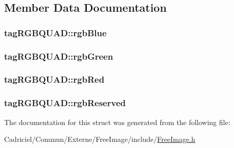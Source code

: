 \subsection{Member Data Documentation}
\hypertarget{structtag_r_g_b_q_u_a_d_ad99c50770a73c6fae3ee1ea627da1c60}{
\subsubsection[{rgb\-Blue}]{ tag\-R\-G\-B\-Q\-U\-A\-D\-::rgb\-Blue}}\label{structtag_r_g_b_q_u_a_d_ad99c50770a73c6fae3ee1ea627da1c60}
\hypertarget{structtag_r_g_b_q_u_a_d_a4dae0a7db2f4d432cb4da3de4ef337bd}{
\subsubsection[{rgb\-Green}]{ tag\-R\-G\-B\-Q\-U\-A\-D\-::rgb\-Green}}\label{structtag_r_g_b_q_u_a_d_a4dae0a7db2f4d432cb4da3de4ef337bd}
\hypertarget{structtag_r_g_b_q_u_a_d_aa143fcd3ff08a04b152bee9d410821a6}{
\subsubsection[{rgb\-Red}]{ tag\-R\-G\-B\-Q\-U\-A\-D\-::rgb\-Red}}\label{structtag_r_g_b_q_u_a_d_aa143fcd3ff08a04b152bee9d410821a6}
\hypertarget{structtag_r_g_b_q_u_a_d_a2758aec56e37d4f3f5fde511a58f4f82}{
\subsubsection[{rgb\-Reserved}]{ tag\-R\-G\-B\-Q\-U\-A\-D\-::rgb\-Reserved}}\label{structtag_r_g_b_q_u_a_d_a2758aec56e37d4f3f5fde511a58f4f82}


The documentation for this struct was generated from the following file\-:\begin{DoxyCompactItemize}
\item 
Cadriciel/\-Commun/\-Externe/\-Free\-Image/include/\hyperlink{_free_image_8h}{Free\-Image.\-h}\end{DoxyCompactItemize}
